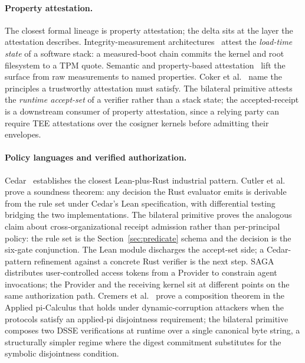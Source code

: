 \paragraph{Property attestation.} The closest formal lineage is property attestation; the delta sits at the layer the attestation describes. Integrity-measurement architectures~\cite{sailerIMA2004} attest the \emph{load-time state} of a software stack: a measured-boot chain commits the kernel and root filesystem to a TPM quote. Semantic and property-based attestation~\cite{haldarSemanticAttestation2004,sadeghiPropertyAttestation2004} lift the surface from raw measurements to named properties. Coker et al.~\cite{cokerRemoteAttestation2011} name the principles a trustworthy attestation must satisfy. The bilateral primitive attests the \emph{runtime accept-set} of a verifier rather than a stack state; the accepted-receipt is a downstream consumer of property attestation, since a relying party can require TEE attestations over the cosigner kernels before admitting their envelopes.

\paragraph{Policy languages and verified authorization.} Cedar~\cite{cedarOOPSLA2024,cedarFSE2024} establishes the closest Lean-plus-Rust industrial pattern. Cutler et al. prove a soundness theorem: any decision the Rust evaluator emits is derivable from the rule set under Cedar's Lean specification, with differential testing bridging the two implementations. The bilateral primitive proves the analogous claim about cross-organizational receipt admission rather than per-principal policy: the rule set is the Section~\ref{sec:predicate} schema and the decision is the six-gate conjunction. The Lean module  discharges the accept-set side; a Cedar-pattern refinement against a concrete Rust verifier is the next step. SAGA~\cite{sagaNDSS2025} distributes user-controlled access tokens from a Provider to constrain agent invocations; the Provider and the receiving kernel sit at different points on the same authorization path. Cremers et al.~\cite{cremersComposition2026} prove a composition theorem in the Applied pi-Calculus that holds under dynamic-corruption attackers when the protocols satisfy an applied-pi disjointness requirement; the bilateral primitive composes two DSSE verifications at runtime over a single canonical byte string, a structurally simpler regime where the digest commitment substitutes for the symbolic disjointness condition.

